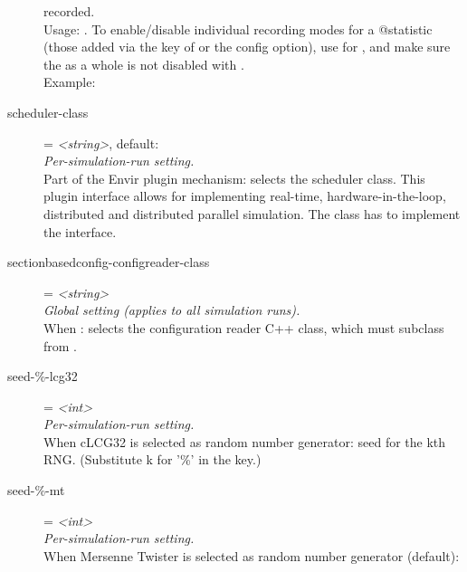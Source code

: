 \begin{description}
    recorded.\\
    Usage:
    .
    To enable/disable individual recording modes for a @statistic (those added
    via the  key of
     or the
    config option), use 
    for , and make sure the
     as a whole is not disabled with
    .\\
    Example:
\item[scheduler-class] = \textit{<string>}, default: \\
    \textit{Per-simulation-run setting.}\\
    Part of the Envir plugin mechanism: selects the scheduler class. This
    plugin interface allows for implementing real-time, hardware-in-the-loop,
    distributed and distributed parallel simulation. The class has to implement
    the  interface.
\item[sectionbasedconfig-configreader-class] = \textit{<string>}\\
    \textit{Global setting (applies to all simulation runs).}\\
    When
    :
    selects the configuration reader C++ class, which must subclass from
    .
\item[seed-\%-lcg32] = \textit{<int>}\\
    \textit{Per-simulation-run setting.}\\
    When cLCG32 is selected as random number generator: seed for the kth RNG.
    (Substitute k for '\%' in the key.)
\item[seed-\%-mt] = \textit{<int>}\\
    \textit{Per-simulation-run setting.}\\
    When Mersenne Twister is selected as random number generator (default):

\end{description}
